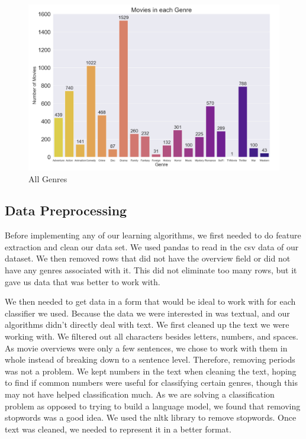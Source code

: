 \documentclass[sigconf]{acmart}
\begin{document}
\begin{figure}
	\includegraphics[width=\linewidth]{all_genres.png}
	\caption{All Genres}
	\label{fig:all}
\end{figure}


\subsection{Data Preprocessing}
Before implementing any of our learning algorithms, we first needed to do feature extraction and clean our data set.  We used pandas to read in the csv data of our dataset.  We then removed rows that did not have the overview field or did not have any genres associated with it.  This did not eliminate too many rows, but it gave us data that was better to work with.

We then needed to get data in a form that would be ideal to work with for each classifier we used.  Because the data we were interested in was textual, and our algorithms didn't directly deal with text. We first cleaned up the text we were working with.  We filtered out all characters besides letters, numbers, and spaces. As movie overviews were only a few sentences, we chose to work with them in whole instead of breaking down to a sentence level. Therefore, removing periods was not a problem.  We kept numbers in the text when cleaning the text, hoping to find if common numbers were useful for classifying certain genres, though this may not have helped classification much.  As we are solving a classification problem as opposed to trying to build a language model, we found that removing stopwords was a good idea. We used the nltk library to remove stopwords. Once text was cleaned, we needed to represent it in a better format. 
\end{document}
